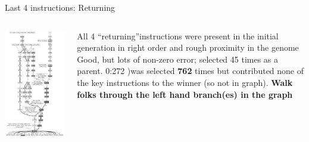 \documentclass{beamer}
\newcommand{\linespace}{\vskip 0.25cm}
\begin{document}
\begin{frame}{Last 4 instructions: Returning}
	
	\begin{columns}
		\begin{column}{0.4 \linewidth}
			\centering
			\includegraphics[height = 0.8 \textheight]{../../figures/filtered_fill.pdf}
		\end{column}
		
		\begin{column}{0.6 \linewidth}
			All 4 ``returning''instructions were present in the initial generation in right order and rough proximity in the genome
			\linespace
			Good, but lots of non-zero error; selected 45 times as a parent. 0:272 )was selected \textbf{762} times but contributed none of the key instructions to the winner (so not in graph).
			\linespace
			\textbf{Walk folks through the left hand branch(es) in the graph}
		\end{column}
	\end{columns}
\end{frame}
\end{document}
